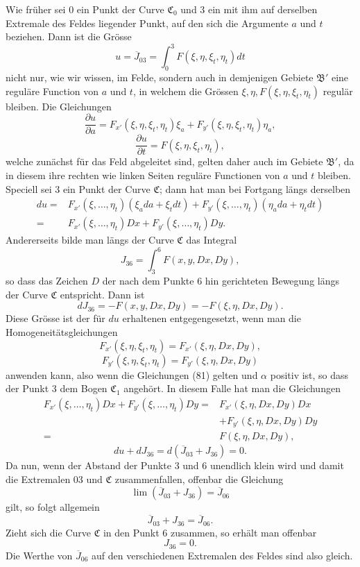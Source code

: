 \documentclass[11pt,a4paper,leqno]{article}
\begin{document}
Wie früher sei 0 ein Punkt der Curve $\mathfrak{C}_0$ und 3 ein mit ihm auf derselben Extremale des Feldes liegender Punkt, auf den sich die Argumente $a$ und $t$ beziehen. Dann ist die Grösse
\[
u=\overline{J}_{03}=\int_0^3F(\xi,\eta,\xi_t,\eta_t)dt
\]
nicht nur, wie wir wissen, im Felde, sondern auch in demjenigen Gebiete $\mathfrak{B}'$ eine reguläre Function von $a$ und $t$, in welchem die Grössen $\xi,\eta,F(\xi,\eta,\xi_t,\eta_t)$ regulär bleiben. Die Gleichungen
\[
\frac{\partial u}{\partial a}=F_{x'}(\xi,\eta,\xi_t,\eta_t)\xi_a
+F_{y'}(\xi,\eta,\xi_t,\eta_t)\eta_a,
\]
\[
\frac{\partial u}{\partial t}=F(\xi,\eta,\xi_t,\eta_t),
\]
welche zunächst für das Feld abgeleitet sind, gelten daher auch im Gebiete $\mathfrak{B}'$, da in diesem ihre rechten wie linken Seiten reguläre Functionen von $a$ und $t$ bleiben. Speciell sei 3 ein Punkt der Curve $\mathfrak{C}$; dann hat man bei Fortgang längs derselben
\[
\begin{aligned}
du={}&F_{x'}(\xi,\ldots,\eta_t)(\xi_a da+\xi_tdt)
+F_{y'}(\xi,\ldots,\eta_t)(\eta_ada+\eta_tdt)\\
={}&F_{x'}(\xi,\ldots,\eta_t)Dx+F_{y'}(\xi,\ldots,\eta_t)Dy.
\end{aligned}
\]
Andererseits bilde man längs der Curve $\mathfrak{C}$ das Integral
\[
J_{36}=\int_3^6F(x,y,Dx,Dy),
\]
so dass das Zeichen $D$ der nach dem Punkte 6 hin gerichteten Bewegung längs der Curve $\mathfrak{C}$ entspricht. Dann ist
\[
dJ_{36}=-F(x,y,Dx,Dy)=-F(\xi,\eta,Dx,Dy).
\]
Diese Grösse ist der für $du$ erhaltenen entgegengesetzt, wenn man die Homogeneitätsgleichungen
\[
F_{x'}(\xi,\eta,\xi_t,\eta_t)=F_{x'}(\xi,\eta,Dx,Dy),
\]
\[
F_{y'}(\xi,\eta,\xi_t,\eta_t)=F_{y'}(\xi,\eta,Dx,Dy)
\]
anwenden kann, also wenn die Gleichungen (81) gelten und $\alpha$ positiv ist, so dass der Punkt 3 dem Bogen $\mathfrak{C}_1$ angehört. In diesem Falle hat man die Gleichungen
\[
\begin{aligned}
F_{x'}(\xi,\ldots,\eta_t)Dx+F_{y'}(\xi,\ldots,\eta_t)Dy
={}&F_{x'}(\xi,\eta,Dx,Dy)Dx\\
&+F_{y'}(\xi,\eta,Dx,Dy)Dy\\
={}&F(\xi,\eta,Dx,Dy),
\end{aligned}
\]
\[
du+dJ_{36}=d(\overline{J}_{03}+J_{36})=0.
\]
Da nun, wenn der Abstand der Punkte 3 und 6 unendlich klein wird und damit die Extremalen 03 und $\mathfrak{C}$ zusammenfallen, offenbar die Gleichung
\[
\lim(\overline{J}_{03}+J_{36})=\overline{J}_{06}
\]
gilt, so folgt allgemein
\begin{equation}\tag{82}
\overline{J}_{03}+J_{36}=\overline{J}_{06}.
\end{equation}
Zieht sich die Curve $\mathfrak{C}$ in den Punkt 6 zusammen, so erhält man offenbar
\[
J_{36}=0.
\]
Die Werthe von $\overline{J}_{06}$ auf den verschiedenen Extremalen des Feldes sind also gleich.
\end{document}
